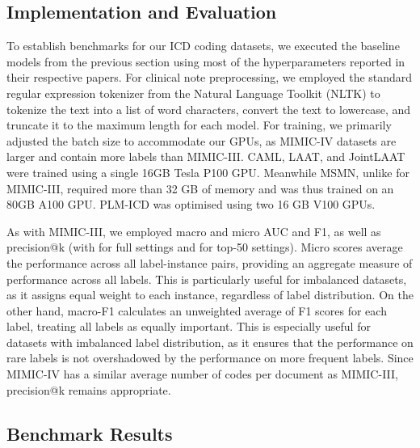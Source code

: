 \documentclass[11pt]{article}
\begin{document}
\subsection{Implementation and Evaluation}
To establish benchmarks for our ICD coding datasets, we executed the baseline models from the previous section using most of the hyperparameters reported in their respective papers. For clinical note preprocessing, we employed the standard regular expression tokenizer from the Natural Language Toolkit (NLTK) to tokenize the text into a list of word characters, convert the text to lowercase, and truncate it to the maximum length for each model. For training, we primarily adjusted the batch size to accommodate our GPUs, as MIMIC-IV datasets are larger and contain more labels than MIMIC-III. CAML, LAAT, and JointLAAT were trained using a single 16GB Tesla P100 GPU. Meanwhile MSMN, unlike for MIMIC-III, required more than 32 GB of memory and was thus trained on an 80GB A100 GPU. PLM-ICD was optimised using two 16 GB V100 GPUs.

As with MIMIC-III, we employed macro and micro AUC and F1, as well as precision@k (with  for full settings and  for top-50 settings). Micro scores average the performance across all label-instance pairs, providing an aggregate measure of performance across all labels. This is particularly useful for imbalanced datasets, as it assigns equal weight to each instance, regardless of label distribution. On the other hand, macro-F1 calculates an unweighted average of F1 scores for each label, treating all labels as equally important. This is especially useful for datasets with imbalanced label distribution, as it ensures that the performance on rare labels is not overshadowed by the performance on more frequent labels. Since MIMIC-IV has a similar average number of codes per document as MIMIC-III, precision@k remains appropriate.

\subsection{Benchmark Results}
\end{document}
